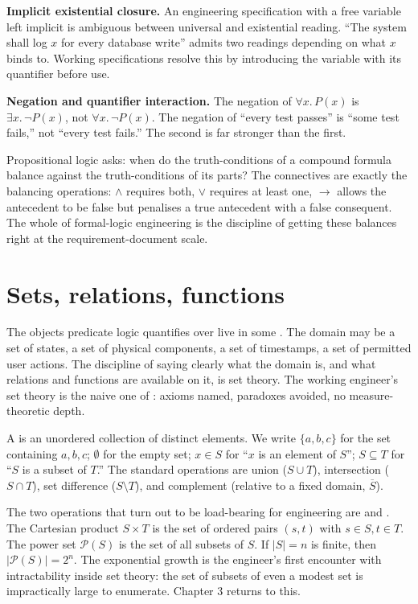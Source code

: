 \textbf{Implicit existential closure.} An engineering specification with a free variable left implicit is ambiguous between universal and existential reading. ``The system shall log $x$ for every database write'' admits two readings depending on what $x$ binds to. Working specifications resolve this by introducing the variable with its quantifier before use.

\textbf{Negation and quantifier interaction.} The negation of $\forall x.\, P(x)$ is $\exists x.\, \lnot P(x)$, not $\forall x.\, \lnot P(x)$. The negation of ``every test passes'' is ``some test fails,'' not ``every test fails.'' The second is far stronger than the first.

\begin{archetype}[Balance]
Propositional logic asks: when do the truth-conditions of a compound formula balance against the truth-conditions of its parts? The connectives are exactly the balancing operations: $\wedge$ requires both, $\vee$ requires at least one, $\to$ allows the antecedent to be false but penalises a true antecedent with a false consequent. The whole of formal-logic engineering is the discipline of getting these balances right at the requirement-document scale.
\end{archetype}

\section{Sets, relations, functions}

The objects predicate logic quantifies over live in some . The domain may be a set of states, a set of physical components, a set of timestamps, a set of permitted user actions. The discipline of saying clearly what the domain is, and what relations and functions are available on it, is set theory. The working engineer's set theory is the naive one of \cite{text:halmos-naive-sets}: axioms named, paradoxes avoided, no measure-theoretic depth.

A  is an unordered collection of distinct elements. We write $\{a, b, c\}$ for the set containing $a, b, c$; $\emptyset$ for the empty set; $x \in S$ for ``$x$ is an element of $S$''; $S \subseteq T$ for ``$S$ is a subset of $T$.'' The standard operations are union ($S \cup T$), intersection ($S \cap T$), set difference ($S \setminus T$), and complement (relative to a fixed domain, $\overline{S}$).

The two operations that turn out to be load-bearing for engineering are  and . The Cartesian product $S \times T$ is the set of ordered pairs $(s, t)$ with $s \in S, t \in T$. The power set $\mathcal{P}(S)$ is the set of all subsets of $S$. If $|S| = n$ is finite, then $|\mathcal{P}(S)| = 2^n$. The exponential growth is the engineer's first encounter with intractability inside set theory: the set of subsets of even a modest set is impractically large to enumerate. Chapter 3 returns to this.

